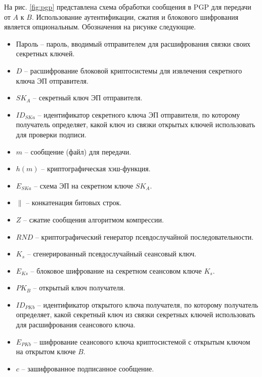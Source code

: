На рис. \ref{fig:pgp} представлена схема обработки сообщения в PGP для передачи от $A$ к $B$. Использование аутентификации, сжатия и блокового шифрования является опциональным. Обозначения на рисунке следующие.
\begin{itemize}
    \item Пароль -- пароль, вводимый отправителем для расшифрования связки своих секретных ключей.
    \item $D$ -- расшифрование блоковой криптосистемы для извлечения секретного ключа ЭП отправителя.
    \item $SK_A$ -- секретный ключ ЭП отправителя.
    \item $ID_{SKa}$ -- идентификатор секретного ключа ЭП отправителя, по которому получатель определяет, какой ключ из связки открытых ключей использовать для проверки подписи.
    \item $m$ -- сообщение (файл) для передачи.
    \item $h(m)$ -- криптографическая хэш-функция.
    \item $E_{SKa}$ -- схема ЭП на секретном ключе $SK_A$.
    \item $\|$ -- конкатенация битовых строк.
    \item $Z$ -- сжатие сообщения алгоритмом компрессии.
    \item $RND$ -- криптографический генератор псевдослучайной последовательности.
    \item $K_s$ -- сгенерированный псевдослучайный сеансовый ключ.
    \item $E_{Ks}$ -- блоковое шифрование на секретном сеансовом ключе $K_s$.
    \item $PK_B$ -- открытый ключ получателя.
    \item $ID_{PKb}$ -- идентификатор открытого ключа получателя, по которому получатель определяет, какой секретный ключ из связки секретных ключей использовать для расшифрования сеансового ключа.
    \item $E_{PKb}$ -- шифрование сеансового ключа криптосистемой с открытым ключом на открытом ключе $B$.
    \item $c$ -- зашифрованное подписанное сообщение.
\end{itemize}
